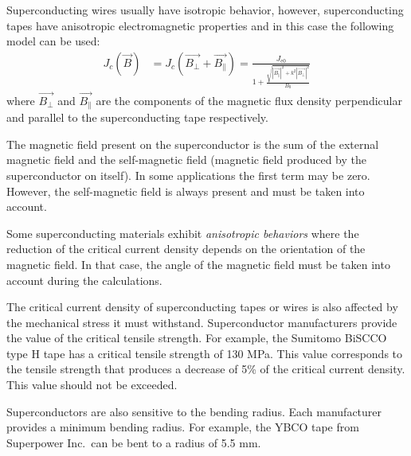 \documentclass{ws-jmrr}
\begin{document}
\begin{multicols}{2}
Superconducting wires usually have isotropic behavior, however, superconducting tapes have anisotropic electromagnetic properties and in this case the following model can be used:
\begin{align}
J_c(\vec{B})&=J_c(\vec{B_{\perp}}+\vec{B_{\parallel}})=\frac{J_{\textrm{c0}}}{1+\frac{\sqrt{|\vec{B_{\parallel}}|^2+k^2|\vec{B_{\perp}}|^2}}{B_0}}
\label{model2}
\end{align}
where $\vec{B_{\perp}}$ and $\vec{B_{\parallel}}$ are the components of the magnetic flux density perpendicular and parallel to the superconducting tape respectively.\par
The magnetic field present on the superconductor is the sum of the external magnetic field and the self-magnetic field (magnetic field produced by the superconductor on itself). In some applications the first term may be zero. However, the self-magnetic field is always present and must be taken into account. \par
Some superconducting materials exhibit \emph{anisotropic behaviors} where the reduction of the critical current density depends on the orientation of the magnetic field. In that case, the angle of the magnetic field must be taken into account during the calculations.\par
The critical current density of superconducting tapes or wires is also affected by the mechanical stress it must withstand. Superconductor manufacturers provide the value of the critical tensile strength. For example, the Sumitomo BiSCCO type H tape has a critical tensile strength of 130 MPa. This value corresponds to the tensile strength that produces a decrease of 5\% of the critical current density. This value should not be exceeded.\par
Superconductors are also sensitive to the bending radius. Each manufacturer provides a minimum bending radius. For example, the YBCO tape from Superpower Inc.\ can be bent to a radius of 5.5 mm.



\end{multicols}
\end{document}
